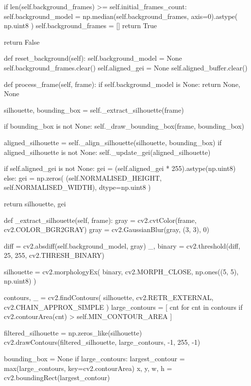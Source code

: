 \begin{appendices}
\begin{code}
        if len(self.background_frames) >= self.initial_frames_count:
            self.background_model = np.median(self.background_frames, axis=0).astype(
                np.uint8
            )
            self.background_frames = []
            return True

        return False

    def reset_background(self):
        self.background_model = None
        self.background_frames.clear()
        self.aligned_gei = None
        self.aligned_buffer.clear()

    def process_frame(self, frame):
        if self.background_model is None:
            return None, None

        silhouette, bounding_box = self._extract_silhouette(frame)

        if bounding_box is not None:
            self._draw_bounding_box(frame, bounding_box)

            aligned_silhouette = self._align_silhouette(silhouette, bounding_box)
            if aligned_silhouette is not None:
                self._update_gei(aligned_silhouette)

        if self.aligned_gei is not None:
            gei = (self.aligned_gei * 255).astype(np.uint8)
        else:
            gei = np.zeros(
                (self.NORMALISED_HEIGHT, self.NORMALISED_WIDTH), dtype=np.uint8
            )

        return silhouette, gei

    def _extract_silhouette(self, frame):
        gray = cv2.cvtColor(frame, cv2.COLOR_BGR2GRAY)
        gray = cv2.GaussianBlur(gray, (3, 3), 0)

        diff = cv2.absdiff(self.background_model, gray)
        _, binary = cv2.threshold(diff, 25, 255, cv2.THRESH_BINARY)

        silhouette = cv2.morphologyEx(
            binary, cv2.MORPH_CLOSE, np.ones((5, 5), np.uint8)
        )

        contours, _ = cv2.findContours(
            silhouette, cv2.RETR_EXTERNAL, cv2.CHAIN_APPROX_SIMPLE
        )
        large_contours = [
            cnt for cnt in contours if cv2.contourArea(cnt) > self.MIN_CONTOUR_AREA
        ]

        filtered_silhouette = np.zeros_like(silhouette)
        cv2.drawContours(filtered_silhouette, large_contours, -1, 255, -1)

        bounding_box = None
        if large_contours:
            largest_contour = max(large_contours, key=cv2.contourArea)
            x, y, w, h = cv2.boundingRect(largest_contour)


\end{code}
\end{appendices}
